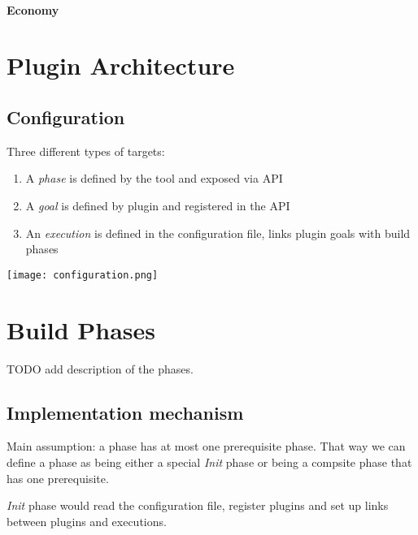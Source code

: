 \documentclass[11pt]{article}
\begin{document}
\paragraph{Economy}

\section{Plugin Architecture}
\subsection{Configuration}
Three different types of targets:
\begin{enumerate}
\item A \textit{phase} is defined by the tool and exposed via API
\item A \textit{goal} is defined by plugin and registered in the API
\item An \textit{execution} is defined in the configuration file, links plugin goals with build phases
\end{enumerate}

\texttt{[image: configuration.png]}

\section{Build Phases}
TODO add description of the phases.

\subsection{Implementation mechanism}
Main assumption: a phase has at most one prerequisite phase. That way we can
define a phase as being either a special \textit{Init} phase or being a
compsite phase that has one prerequisite.

\textit{Init} phase would read the configuration file, register plugins and set
up links between plugins and executions.
\end{document}

